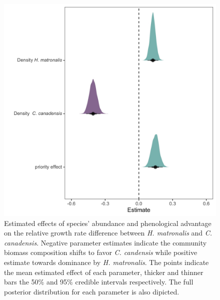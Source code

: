 \documentclass{article}\usepackage[]{graphicx}\usepackage[]{color}
\begin{document}
{\begin{figure}[h!]
    \centering
\includegraphics[width=\textwidth]{..//figure/mu_plots.jpeg}
    \caption{Estimated effects of species' abundance and phenological advantage on the relative growth rate difference between \textit{H. matronalis} and \textit{C. canadensis}. Negative parameter estimates indicate the community biomass composition shifts to favor \textit{C. candensis} while positive estimate towards dominance by \textit{ H. matronalis}. The points indicate the mean estimated effect of each parameter, thicker  and thinner bars the 50\% and 95\% credible intervals respectively. The full posterior distribution for each parameter is also dipicted. 
    } 
    \label{fig:RGRD}
\end{figure}

}
\end{document}
